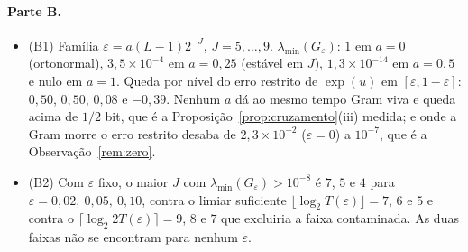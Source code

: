 \documentclass[11pt,a4paper]{article}
\newcommand{\lmin}{\lambda_{\min}}
\newcommand{\eps}{\varepsilon}
\begin{document}
\paragraph{Parte B.}
\begin{itemize}[leftmargin=*, nosep]
  \item (B1) Família $\eps = a(L-1)2^{-J}$, $J = 5,\dots,9$. $\lmin(G_{\eps})$:
    $1$ em $a = 0$ (ortonormal), $3{,}5\times10^{-4}$ em $a = 0{,}25$
    (estável em $J$), $1{,}3\times10^{-14}$ em $a = 0{,}5$ e nulo em $a = 1$.
    Queda por nível do erro restrito de $\exp(u)$ em $[\eps, 1-\eps]$:
    $0{,}50$, $0{,}50$, $0{,}08$ e $-0{,}39$. Nenhum $a$ dá ao mesmo tempo
    Gram viva e queda acima de $1/2$ bit, que é a
    Proposição~\ref{prop:cruzamento}(iii) medida; e onde a Gram morre o erro
    restrito desaba de $2{,}3\times10^{-2}$ ($\eps = 0$) a
    $10^{-7}$, que é a Observação~\ref{rem:zero}.
  \item (B2) Com $\eps$ fixo, o maior $J$ com $\lmin(G_{\eps}) > 10^{-8}$ é
    $7$, $5$ e $4$ para $\eps = 0{,}02,\ 0{,}05,\ 0{,}10$, contra o limiar
    suficiente $\lfloor\log_{2}T(\eps)\rfloor = 7$, $6$ e $5$ e contra o
    $\lceil\log_{2}2T(\eps)\rceil = 9$, $8$ e $7$ que excluiria a faixa
    contaminada. As duas faixas não se encontram para nenhum $\eps$.
\end{itemize}
\end{document}

